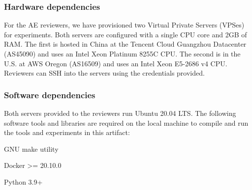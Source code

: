 \subsubsection{Hardware dependencies}
For the AE reviewers,
we have provisioned two Virtual Private Servers (VPSes) for experiments.
Both servers are configured with a single CPU core and 2GB of RAM. 
The first is hosted in
China at the Tencent Cloud Guangzhou Datacenter
(AS45090) and uses an Intel Xeon Platinum 8255C CPU.
The second is in the U.S. at AWS Oregon (AS16509) and
uses an Intel Xeon E5-2686 v4 CPU. Reviewers can SSH into the servers 
using the credentials provided.


\subsubsection{Software dependencies}
Both servers provided to the reviewers run Ubuntu 20.04 LTS.
The following software tools and libraries are required
on the local machine to compile and run the
tools and experiments in this artifact:

\begin{compactitem}
    \item GNU make utility
    \item Docker >= 20.10.0
    \item Python 3.9+
\end{compactitem}

